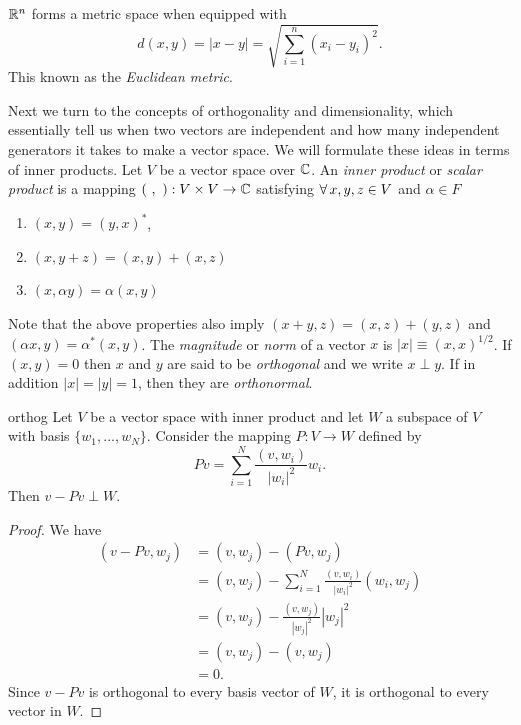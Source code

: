 \begin{example*}{}{}
 $\mathbb{R}^n$ forms a metric space when equipped with
  \begin{equation}
    d(x,y)=|x-y|=\sqrt{\sum\limits_{i=1}^n(x_i-y_i)^2}.
  \end{equation}
  This known as the {\it Euclidean metric}.
\end{example*}

Next we turn to the concepts of orthogonality and dimensionality, which
essentially tell us when two vectors are independent and how many independent
generators it takes to make a vector space.
We will formulate these ideas in terms of inner products.
  Let $V$ be a vector space over $\mathbb{C}$. An {\it inner
  product} or {\it scalar product} is a mapping
  $(\ ,\ ):V\times V\to \C$
  satisfying $\operatorname{\forall} x,y,z\in V$ and $\alpha \in F$
  \begin{enumerate}
    \item $(x,y)=(y,x)^{*}$,
    \item $(x,y+z)=(x,y)+(x,z)$
    \item $(x,\alpha y)=\alpha(x,y)$
  \end{enumerate}
  Note that the above properties also imply $(x+y,z)=(x,z)+(y,z)$ and
  $(\alpha x,y)=\alpha^{*}(x,y)$. The {\it magnitude} or {\it norm}
  of a vector $x$ is $|x|\equiv(x,x)^{1/2}$. If $(x,y)=0$ then $x$
  and $y$ are said to be {\it orthogonal} and we write $x\perp y$.
  If in addition $|x|=|y|=1$, then they are {\it orthonormal}.

\begin{proposition}{}{orthog}
  Let $V$ be a vector space with inner product and let $W$ a subspace
  of $V$ with basis $\{w_1,...,w_N\}$. Consider the mapping $P:V\to W$
  defined by
  $$
    Pv=\sum_{i=1}^N\frac{(v,w_i)}{|w_i|^2}w_i.
  $$
  Then $v-Pv\perp W.$
  \begin{proof}
    We have
    \begin{equation*}
      \begin{aligned}
        (v-Pv,w_j)&=(v,w_j)-(Pv,w_j)\\
          &=(v,w_j)-\sum_{i=1}^N\frac{(v,w_i)}{|w_i|^2}(w_i,w_j)\\
          &=(v,w_j)-\frac{(v,w_j)}{|w_j|^2}|w_j|^2\\
          &=(v,w_j)-(v,w_j)\\
          &=0.
      \end{aligned}
    \end{equation*}
    Since $v-Pv$ is orthogonal to every basis vector of $W$, it is
    orthogonal to every vector in $W$.
  \end{proof}
\end{proposition}

